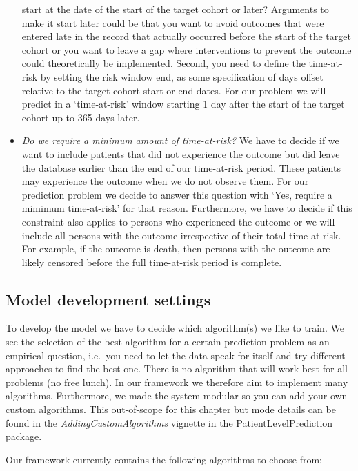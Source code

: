 \documentclass[11pt]{book}
\begin{document}
\begin{itemize}
  start at the date of the start of the target cohort or later?
  Arguments to make it start later could be that you want to avoid
  outcomes that were entered late in the record that actually occurred
  before the start of the target cohort or you want to leave a gap where
  interventions to prevent the outcome could theoretically be
  implemented. Second, you need to define the time-at-risk by setting
  the risk window end, as some specification of days offset relative to
  the target cohort start or end dates. For our problem we will predict
  in a `time-at-risk' window starting 1 day after the start of the
  target cohort up to 365 days later.
\item
  \emph{Do we require a minimum amount of time-at-risk?} We have to
  decide if we want to include patients that did not experience the
  outcome but did leave the database earlier than the end of our
  time-at-risk period. These patients may experience the outcome when we
  do not observe them. For our prediction problem we decide to answer
  this question with `Yes, require a mimimum time-at-risk' for that
  reason. Furthermore, we have to decide if this constraint also applies
  to persons who experienced the outcome or we will include all persons
  with the outcome irrespective of their total time at risk. For
  example, if the outcome is death, then persons with the outcome are
  likely censored before the full time-at-risk period is complete.
\end{itemize}

\subsection{Model development
settings}\label{model-development-settings}

To develop the model we have to decide which algorithm(s) we like to
train. We see the selection of the best algorithm for a certain
prediction problem as an empirical question, i.e.~you need to let the
data speak for itself and try different approaches to find the best one.
There is no algorithm that will work best for all problems (no free
lunch). In our framework we therefore aim to implement many algorithms.
Furthermore, we made the system modular so you can add your own custom
algorithms. This out-of-scope for this chapter but mode details can be
found in the \emph{AddingCustomAlgorithms} vignette in the
\href{https://ohdsi.github.io/PatientLevelPrediction/}{PatientLevelPrediction}
package.

Our framework currently contains the following algorithms to choose
from:
\end{document}
